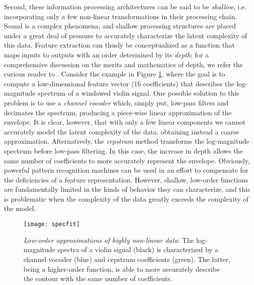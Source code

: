 Second, these information processing architectures can be said to be \emph{shallow}, i.e. incorporating only a few non-linear transformations in their processing chain.
Sound is a complex phenomena, and shallow processing structures are placed under a great deal of pressure to accurately characterize the latent complexity of this data.
Feature extraction can thusly be conceptualized as a function that maps inputs to outputs with an order determined by its \emph{depth}; for a comprehensive discussion on the merits and mathematics of depth, we refer the curious reader to \cite{Bengio2009}.
Consider the example in Figure \ref{fig:curvefit}, where the goal is to compute a low-dimensional feature vector (16 coefficients) that describes the log-magnitude spectrum of a windowed violin signal.
One possible solution to this problem is to use a \emph{channel vocoder} which, simply put, low-pass filters and decimates the spectrum, producing a piece-wise linear approximation of the envelope.
It is clear, however, that with only a few linear components we cannot accurately model the latent complexity of the data, obtaining instead a coarse approximation.
Alternatively, the \emph{cepstrum} method transforms the log-magnitude spectrum before low-pass filtering.
In this case, the increase in depth allows the same number of coefficients to more accurately represent the envelope.
Obviously, powerful pattern recognition machines can be used in an effort to compensate for the deficiencies of a feature representation.
However, shallow, low-order functions are fundamentally limited in the kinds of behavior they can characterize, and this is problematic when the complexity of the data greatly exceeds the complexity of the model.

\begin{figure}[t]
\begin{centering}
\texttt{[image: specfit]}
\caption{\emph{Low-order approximations of highly non-linear data}: The log-magnitude spectra of a violin signal (black) is characterized by a channel vocoder (blue) and cepstrum coefficients (green). The latter, being a higher-order function, is able to more accurately describe the contour with the same number of coefficients.}
\label{fig:curvefit}
\end{centering}
\end{figure}

